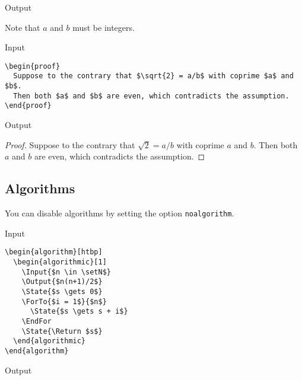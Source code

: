 \documentclass[a4paper, 11pt]{article}
\begin{document}
\begin{itembox}[l]{Output}
  \begin{remark}
    Note that $a$ and $b$ must be integers.
  \end{remark}
\end{itembox}

\begin{itembox}[l]{Input}
  \begin{verbatim}
\begin{proof}
  Suppose to the contrary that $\sqrt{2} = a/b$ with coprime $a$ and $b$.
  Then both $a$ and $b$ are even, which contradicts the assumption.
\end{proof}
\end{verbatim}
\end{itembox}

\begin{itembox}[l]{Output}
  \begin{proof}
    Suppose to the contrary that $\sqrt{2} = a/b$ with coprime $a$ and $b$.
    Then both $a$ and $b$ are even, which contradicts the assumption.
  \end{proof}
\end{itembox}

\subsection{Algorithms}

You can disable algorithms by setting the option \texttt{noalgorithm}.

\begin{itembox}[l]{Input}
  \begin{verbatim}
\begin{algorithm}[htbp]
  \begin{algorithmic}[1]
    \Input{$n \in \setN$}
    \Output{$n(n+1)/2$}
    \State{$s \gets 0$}
    \ForTo{$i = 1$}{$n$}
      \State{$s \gets s + i$}
    \EndFor
    \State{\Return $s$}
  \end{algorithmic}
\end{algorithm}
\end{verbatim}
\end{itembox}

\begin{itembox}[l]{Output}
  \begin{algorithmic}[1]
    \EndFor{}
  \end{algorithmic}
\end{itembox}
\end{document}
